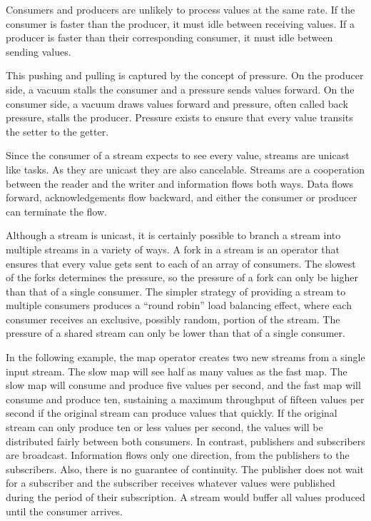 Consumers and producers are unlikely to process values at the same rate. If the consumer is faster than the producer, it must idle between receiving values. If a producer is faster than their corresponding consumer, it must idle between sending values.

This pushing and pulling is captured by the concept of pressure. On the producer side, a vacuum stalls the consumer and a pressure sends values forward. On the consumer side, a vacuum draws values forward and pressure, often called back pressure, stalls the producer. Pressure exists to ensure that every value transits the setter to the getter.

Since the consumer of a stream expects to see every value, streams are unicast like tasks. As they are unicast they are also cancelable. Streams are a cooperation between the reader and the writer and information flows both ways. Data flows forward, acknowledgements flow backward, and either the consumer or producer can terminate the flow.

Although a stream is unicast, it is certainly possible to branch a stream into multiple streams in a variety of ways. A fork in a stream is an operator that ensures that every value gets sent to each of an array of consumers. The slowest of the forks determines the pressure, so the pressure of a fork can only be higher than that of a single consumer. The simpler strategy of providing a stream to multiple consumers produces a “round robin” load balancing effect, where each consumer receives an exclusive, possibly random, portion of the stream. The pressure of a shared stream can only be lower than that of a single consumer.

In the following example, the map operator creates two new streams from a single input stream. The slow map will see half as many values as the fast map. The slow map will consume and produce five values per second, and the fast map will consume and produce ten, sustaining a maximum throughput of fifteen values per second if the original stream can produce values that quickly. If the original stream can only produce ten or less values per second, the values will be distributed fairly between both consumers.
In contrast, publishers and subscribers are broadcast. Information flows only one direction, from the publishers to the subscribers. Also, there is no guarantee of continuity. The publisher does not wait for a subscriber and the subscriber receives whatever values were published during the period of their subscription. A stream would buffer all values produced until the consumer arrives.

